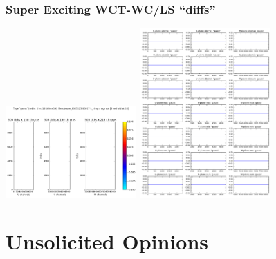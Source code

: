 \documentclass[xcolor=dvipsnames]{beamer}
\begin{document}
\begin{frame}[fragile]
  \frametitle{Super Exciting WCT-WC/LS ``diffs''}
  \includegraphics[width=5cm]{figures/uboone_0005125-00017-1_nf-sp-gauss_thumb.png}%
  \includegraphics[width=5cm]{figures/uboone_0005125-00017-1_nf-sp-gauss_reduc.png}
\end{frame}


\section{Unsolicited Opinions}
\end{document}
